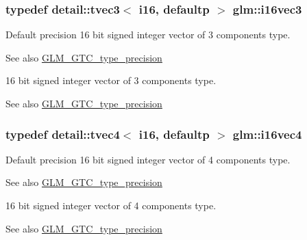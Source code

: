 \subsubsection[{\texorpdfstring{i16vec3}{i16vec3}}]{\setlength{\rightskip}{0pt plus 5cm}typedef detail\+::tvec3$<$ i16, defaultp $>$ {\bf glm\+::i16vec3}}\hypertarget{group__gtc__type__precision_ga22ec113d49837ef823048bb01511564c}{}\label{group__gtc__type__precision_ga22ec113d49837ef823048bb01511564c}
Default precision 16 bit signed integer vector of 3 components type. \begin{DoxySeeAlso}{See also}
\hyperlink{group__gtc__type__precision}{G\+L\+M\+\_\+\+G\+T\+C\+\_\+type\+\_\+precision}
\end{DoxySeeAlso}
16 bit signed integer vector of 3 components type. \begin{DoxySeeAlso}{See also}
\hyperlink{group__gtc__type__precision}{G\+L\+M\+\_\+\+G\+T\+C\+\_\+type\+\_\+precision} 
\end{DoxySeeAlso}
\subsubsection[{\texorpdfstring{i16vec4}{i16vec4}}]{\setlength{\rightskip}{0pt plus 5cm}typedef detail\+::tvec4$<$ i16, defaultp $>$ {\bf glm\+::i16vec4}}\hypertarget{group__gtc__type__precision_ga28cd96ac55e2209bdbd3a41cb8af970a}{}\label{group__gtc__type__precision_ga28cd96ac55e2209bdbd3a41cb8af970a}
Default precision 16 bit signed integer vector of 4 components type. \begin{DoxySeeAlso}{See also}
\hyperlink{group__gtc__type__precision}{G\+L\+M\+\_\+\+G\+T\+C\+\_\+type\+\_\+precision}
\end{DoxySeeAlso}
16 bit signed integer vector of 4 components type. \begin{DoxySeeAlso}{See also}
\hyperlink{group__gtc__type__precision}{G\+L\+M\+\_\+\+G\+T\+C\+\_\+type\+\_\+precision} 
\end{DoxySeeAlso}

